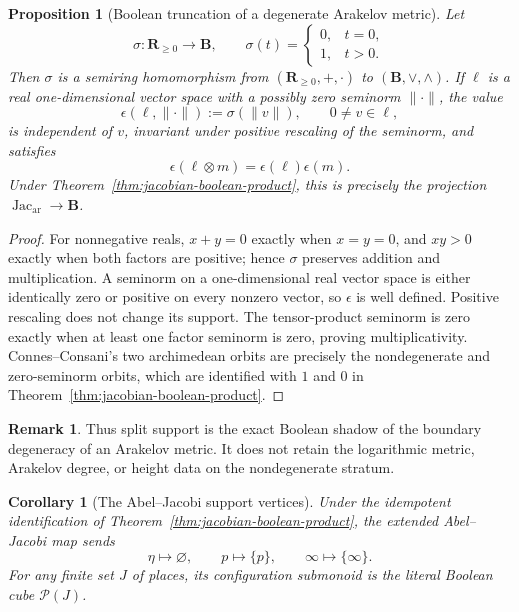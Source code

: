 \documentclass[11pt]{amsart}
\numberwithin{equation}{section}
\newtheorem{proposition}[theorem]{Proposition}
\newtheorem{corollary}[theorem]{Corollary}
\theoremstyle{definition}
\newtheorem{remark}[theorem]{Remark}
\newcommand{\B}{\mathbf B}
\newcommand{\R}{\mathbf R}
\newcommand{\Jacar}{\operatorname{Jac}_{\mathrm{ar}}}
\begin{document}
\begin{proposition}[Boolean truncation of a degenerate Arakelov metric]
\label{prop:arakelov-support-truncation}
Let
\[
\sigma:\R_{\geq0}\longrightarrow\B,
\qquad
\sigma(t)=
\begin{cases}
0,&t=0,\\
1,&t>0.
\end{cases}
\]
Then $\sigma$ is a semiring homomorphism from
$(\R_{\geq0},+,\cdot)$ to $(\B,\vee,\wedge)$.  If $\ell$ is a real
one-dimensional vector space with a possibly zero seminorm $\|\cdot\|$,
the value
\[
\epsilon(\ell,\|\cdot\|):=\sigma(\|v\|),
\qquad 0\neq v\in\ell,
\]
is independent of $v$, invariant under positive rescaling of the
seminorm, and satisfies
\[
\epsilon(\ell\otimes m)=\epsilon(\ell)\epsilon(m).
\]
Under Theorem~\ref{thm:jacobian-boolean-product}, this is precisely the
projection $\Jacar\to\B$.
\end{proposition}

\begin{proof}
For nonnegative reals, $x+y=0$ exactly when $x=y=0$, and $xy>0$ exactly
when both factors are positive; hence $\sigma$ preserves addition and
multiplication.  A seminorm on a one-dimensional real vector space is
either identically zero or positive on every nonzero vector, so
$\epsilon$ is well defined.  Positive rescaling does not change its
support.  The tensor-product seminorm is zero exactly when at least one
factor seminorm is zero, proving multiplicativity.  Connes--Consani's two
archimedean orbits are precisely the nondegenerate and zero-seminorm
orbits, which are identified with $1$ and $0$ in
Theorem~\ref{thm:jacobian-boolean-product}.
\end{proof}

\begin{remark}
Thus split support is the exact Boolean shadow of the boundary degeneracy
of an Arakelov metric.  It does not retain the logarithmic metric,
Arakelov degree, or height data on the nondegenerate stratum.
\end{remark}

\begin{corollary}[The Abel--Jacobi support vertices]
\label{cor:abel-jacobi-support-vertices}
Under the idempotent identification of
Theorem~\ref{thm:jacobian-boolean-product}, the extended Abel--Jacobi map
sends
\[
\eta\longmapsto\varnothing,
\qquad
p\longmapsto\{p\},
\qquad
\infty\longmapsto\{\infty\}.
\]
For any finite set $J$ of places, its configuration submonoid is the
literal Boolean cube $\mathcal P(J)$.
\end{corollary}
\end{document}
